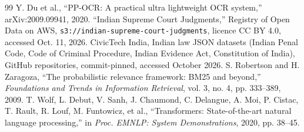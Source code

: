\begin{thebibliography}{99}
 Y. Du et al., ``PP-OCR: A practical ultra lightweight OCR system,'' arXiv:2009.09941, 2020.
 ``Indian Supreme Court Judgments,'' Registry of Open Data on AWS, \texttt{s3://indian-supreme-court-judgments}, licence CC BY 4.0, accessed Oct. 11, 2026.
 CivicTech India, Indian law JSON datasets (Indian Penal Code, Code of Criminal Procedure, Indian Evidence Act, Constitution of India), GitHub repositories, commit-pinned, accessed October 2026.
 S. Robertson and H. Zaragoza, ``The probabilistic relevance framework: BM25 and beyond,'' \emph{Foundations and Trends in Information Retrieval}, vol. 3, no. 4, pp. 333--389, 2009.
 T. Wolf, L. Debut, V. Sanh, J. Chaumond, C. Delangue, A. Moi, P. Cistac, T. Rault, R. Louf, M. Funtowicz, et al., ``Transformers: State-of-the-art natural language processing,'' in \emph{Proc. EMNLP: System Demonstrations}, 2020, pp. 38--45.
\end{thebibliography}
